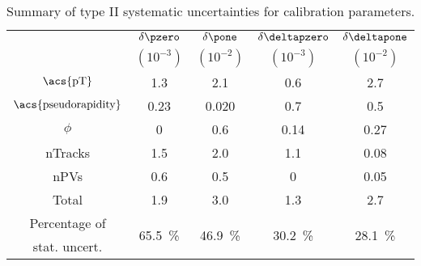 \begin{table}
  \centering
  \caption{Summary of type II systematic uncertainties for \SSpi calibration
  parameters.}
  \label{tab:flavour_tagging:calibration:ss:systematics}
  \begin{tabular}{ccccc}
    \toprule
      & $\delta\pzero$ & $\delta\pone$ & $\delta\deltapzero$ & $\delta\deltapone$ \\
      & $(10^{-3})$    & $(10^{-2})$   & $(10^{-3})$         & $(10^{-2})$        \\
    \midrule
    $\text{\acs{pT}}$             & 1.3  & 2.1   & 0.6  & 2.7  \\
    $\text{\acs{pseudorapidity}}$ & 0.23 & 0.020 & 0.7  & 0.5  \\
    $\phi$                        & 0    & 0.6   & 0.14 & 0.27 \\
    nTracks                       & 1.5  & 2.0   & 1.1  & 0.08 \\
    nPVs                          & 0.6  & 0.5   & 0    & 0.05 \\
    \midrule
      Total                       & 1.9  & 3.0   & 1.3  & 2.7 \\
    \midrule
    Percentage of & 
    \multirow{2}[2]{*}{\SI{65.5}{\percent}} & 
    \multirow{2}[2]{*}{\SI{46.9}{\percent}} & 
    \multirow{2}[2]{*}{\SI{30.2}{\percent}} & 
    \multirow{2}[2]{*}{\SI{28.1}{\percent}} \\
    stat. uncert. \\
    \bottomrule
  \end{tabular}
\end{table}
%

